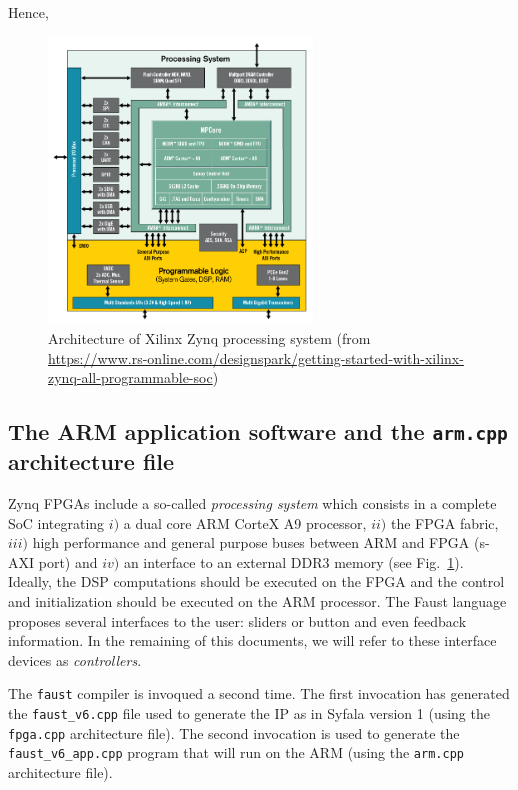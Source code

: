 \documentclass[11pt]{article}
\numberwithin{equation}{section}
\numberwithin{figure}{section}
\begin{document}
Hence,


\begin{figure}[ht]
  \centerline{\includegraphics[width=7cm]{zynq-mp-core-dual1.png}}
  \caption{Architecture of Xilinx Zynq processing system (from \url{https://www.rs-online.com/designspark/getting-started-with-xilinx-zynq-all-programmable-soc})}
  \label{zynq}
\end{figure}

\subsection{The ARM application software  and the {\tt arm.cpp} architecture file}
\label{sec:arm}

Zynq FPGAs include a so-called {\em processing system} which consists in a complete SoC integrating $i)$ a dual core ARM CorteX A9 processor, $ii)$ the FPGA fabric, $iii)$ high performance and general purpose buses between ARM and FPGA (s-AXI port) and $iv)$ an interface to an external DDR3 memory (see Fig.~\ref{zynq}). Ideally,  the DSP computations should be executed on the FPGA and the control and initialization should be executed on  the ARM processor.  The Faust language proposes several interfaces to the user: sliders or button and even feedback information. In the remaining of this documents, we will refer to these interface devices as {\em controllers}.  





The {\tt faust}  compiler is invoqued a second time. The first invocation  has generated the {\tt faust\_v6.cpp} file used to generate the IP as in Syfala version 1 (using the {\tt fpga.cpp} architecture file). The second invocation is used to generate the {\tt faust\_v6\_app.cpp} program that will run on the ARM (using the {\tt arm.cpp} architecture file).
\end{document}
